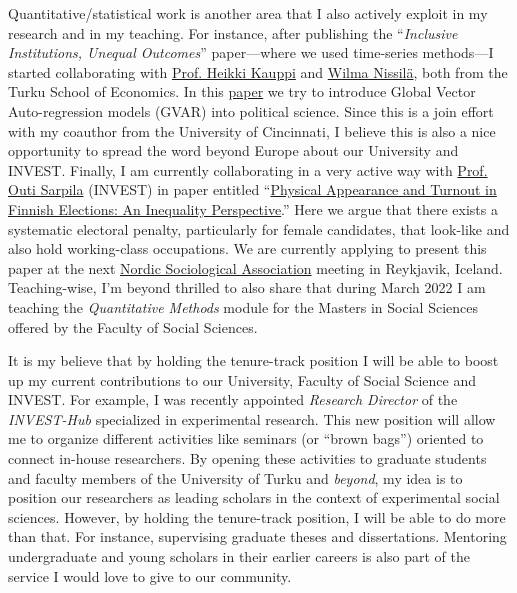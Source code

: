 \documentclass[10pt,stdletter,dateno,sigleft]{newlfm} %
\begin{document}
\begin{newlfm}
Quantitative/statistical work is another area that I also actively exploit in my research and in my teaching. For instance, after publishing the ``\emph{Inclusive Institutions, Unequal Outcomes}'' paper---where we used time-series methods---I started collaborating with \href{https://www.utu.fi/en/people/heikki-kauppi}{Prof. Heikki Kauppi} and \href{https://www.utu.fi/en/people/wilma-nissila}{Wilma Nissil{\"a}}, both from the Turku School of Economics. In this \href{https://github.com/hbahamonde/Bahamonde_Kovac/raw/master/abstract.txt}{paper} we try to introduce Global Vector Auto-regression models (GVAR) into political science. Since this is a join effort with my coauthor from the University of Cincinnati, I believe this is also a nice opportunity to spread the word beyond Europe about our University and INVEST. Finally, I am currently collaborating in a very active way with \href{https://www.utu.fi/en/people/outi-sarpila}{Prof. Outi Sarpila} (INVEST) in paper entitled ``\href{https://raw.githubusercontent.com/hbahamonde/Physical/main/abstract.rtf}{Physical Appearance and Turnout in Finnish Elections: An Inequality Perspective}.'' Here we argue that there exists a systematic electoral penalty, particularly for female candidates, that look-like and also hold working-class occupations. We are currently applying to present this paper at the next \href{https://nsa2022.is}{Nordic Sociological Association} meeting in Reykjavik, Iceland. Teaching-wise, I'm beyond thrilled to also share that during March 2022 I am teaching the \emph{Quantitative Methods} module for the Masters in Social Sciences offered by the Faculty of Social Sciences.

It is my believe that by holding the tenure-track position I will be able to boost up my current contributions to our University, Faculty of Social Science and INVEST. For example, I was recently appointed \emph{Research Director} of the \emph{INVEST-Hub} specialized in experimental research. This new position will allow me to organize different activities like seminars (or ``brown bags'') oriented to connect in-house researchers. By opening these activities to graduate students and faculty members of the University of Turku and \emph{beyond}, my idea is to position our researchers as leading scholars in the context of experimental social sciences. However, by holding the tenure-track position, I will be able to do more than that. For instance, supervising graduate theses and dissertations. Mentoring undergraduate and young scholars in their earlier careers is also part of the service I would love to give to our community. 





\end{newlfm}
\end{document}
